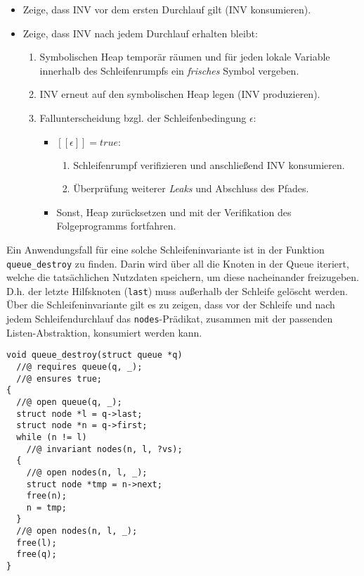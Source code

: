 \begin{itemize}
	\item Zeige, dass INV vor dem ersten Durchlauf gilt (INV konsumieren).
	\item Zeige, dass INV nach jedem Durchlauf erhalten bleibt:
	\begin{enumerate}
		\item Symbolischen Heap temporär räumen und für jeden lokale Variable innerhalb des Schleifenrumpfs ein \emph{frisches} Symbol vergeben.
		\item INV erneut auf den symbolischen Heap legen (INV produzieren).
		\item Fallunterscheidung bzgl. der Schleifenbedingung $\epsilon$:
		\begin{itemize}
			\item $[\![\epsilon]\!] = true:$
			\begin{enumerate}
				\item Schleifenrumpf verifizieren und anschließend INV konsumieren.
				\item Überprüfung weiterer \emph{Leaks} und Abschluss des Pfades.
			\end{enumerate}
			\item Sonst, Heap zurücksetzen und mit der Verifikation des Folgeprogramms fortfahren.
		\end{itemize}
	\end{enumerate}
\end{itemize}

\noindent
Ein Anwendungsfall für eine solche Schleifeninvariante ist in der Funktion \texttt{queue\_destroy} zu finden. Darin wird über all die Knoten in der Queue iteriert, welche die tatsächlichen Nutzdaten speichern, um diese nacheinander freizugeben. D.h. der letzte Hilfsknoten (\texttt{last}) muss außerhalb der Schleife gelöscht werden. Über die Schleifeninvariante gilt es zu zeigen, dass vor der Schleife und nach jedem Schleifendurchlauf das \texttt{nodes}-Prädikat, zusammen mit der passenden Listen-Abstraktion, konsumiert werden kann. 

\begin{lstlisting}
void queue_destroy(struct queue *q)
  //@ requires queue(q, _);
  //@ ensures true;
{
  //@ open queue(q, _);
  struct node *l = q->last;
  struct node *n = q->first;
  while (n != l)
    //@ invariant nodes(n, l, ?vs);
  {
    //@ open nodes(n, l, _);
    struct node *tmp = n->next;
    free(n);
    n = tmp;
  }
  //@ open nodes(n, l, _);
  free(l);
  free(q);
}
\end{lstlisting}

